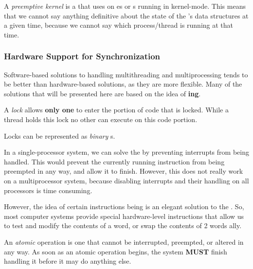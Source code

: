 \begin{definition}\label{def:Preemptive_Kernel}
  A \emph{preemptive kernel} is a  that uses  on es or s running in kernel-mode.
  This means that we cannot say anything definitive about the state of the 's data structures at a given time, because we cannot say which process/thread is running at that time.
\end{definition}

\subsubsection{Hardware Support for Synchronization}\label{subsubsec:Hardware_Support_Synchronization}
Software-based solutions to handling multithreading and multiprocessing tends to be better than hardware-based solutions, as they are more flexible.
Many of the solutions that will be presented here are based on the idea of \textbf{ing}.

\begin{definition}[Lock]\label{def:Lock}
  A \emph{lock} allows \textbf{only one}  to enter the portion of code that is locked.
  While a thread holds this lock no other  can execute on this code portion.

  \begin{remark}\label{rmk:Binary_Semaphore}
    Locks can be represented as \emph{binary }s.
  \end{remark}
\end{definition}

In a single-processor system, we can solve the  by preventing interrupts from being handled.
This would prevent the currently running instruction from being preempted in any way, and allow it to finish.
However, this does not really work on a multiprocessor system, because disabling interrupts and their handling on all processors is time consuming.

However, the idea of certain instructions being  is an elegant solution to the .
So, most computer systems provide special hardware-level instructions that allow us to test and modify the contents of a word, or swap the contents of 2 words ally.

\begin{definition}[Atomic]\label{def:Atomic}
  An \emph{atomic} operation is one that cannot be interrupted, preempted, or altered in any way.
  As soon as an atomic operation begins, the system \textbf{MUST} finish handling it before it may do anything else.
\end{definition}

